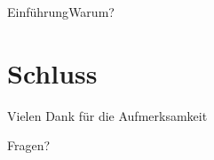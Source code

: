 \documentclass[t,aspectratio=169,divpsnames]{beamer}
\begin{document}
\begin{frame}{Einführung}{Warum?}

\end{frame}

\section*{Schluss}
\begin{frame}
	\begin{center}
		\huge{Vielen Dank für die Aufmerksamkeit}
	\end{center}
	\begin{center}
		\Huge{Fragen?}
	\end{center}
\end{frame}

\begin{frame}[allowframebreaks]{\bibname}
\end{frame}
\end{document}
